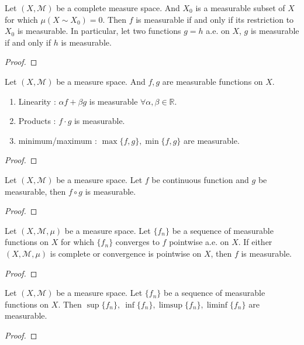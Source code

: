 \begin{theorem}
	Let $(X,\mathcal{M})$ be a complete measure space.
	And $X_0$ is a measurable subset of $X$ for which $\mu(X \sim X_0) = 0$.
	Then $f$ is measurable if and only if its restriction to $X_0$ is measurable.
	In particular, let two functions $g = h$ a.e. on $X$, $g$ is measurable if and only if $h$ is measurable.
\end{theorem}
\begin{proof}
\end{proof}

\begin{theorem}
	Let $(X,\mathcal{M})$ be a measure space. And $f,g$ are measurable functions on $X$.
	\begin{enumerate}
		\item Linearity : $\alpha f + \beta g$ is measurable $\forall \alpha,\beta \in \mathbb{R}$.
		\item Products : $f \cdot g$ is measurable.
		\item minimum/maximum : $\max\{f,g\}, \min\{f,g\}$ are measurable.
	\end{enumerate}
\end{theorem}
\begin{proof}
\end{proof}

\begin{theorem}
	Let $(X,\mathcal{M})$ be a measure space.
	Let $f$ be continuous function and $g$ be measurable, then $f \circ g$ is measurable.
\end{theorem}
\begin{proof}
\end{proof}

\begin{theorem}
	Let $(X,\mathcal{M},\mu)$ be a measure space.
	Let $\{ f_n \}$ be a sequence of measurable functions on $X$ for which $\{ f_n \}$ converges to $f$ pointwise a.e. on $X$.
	If either $(X,\mathcal{M},\mu)$ is complete or convergence is pointwise on $X$, then $f$ is measurable.
\end{theorem}
\begin{proof}
\end{proof}

\begin{corollary}
	Let $(X,\mathcal{M})$ be a measure space.
	Let $\{ f_n \}$ be a sequence of measurable functions on $X$.
	Then $\sup\{f_n\},\ \inf\{f_n\},\limsup\{f_n\},\liminf\{f_n\}$ are measurable.
\end{corollary}
\begin{proof}
\end{proof}

